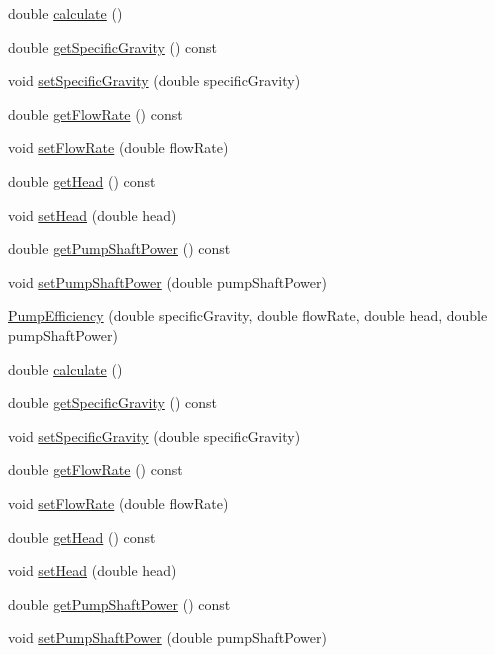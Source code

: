 \begin{DoxyCompactItemize}
\item 
double \hyperlink{class_pump_efficiency_ab45de46019ff182d4f11810b2791a8c9}{calculate} ()
\item 
double \hyperlink{class_pump_efficiency_a6eeeabb70d99a79a636f35ca74d8ec05}{get\+Specific\+Gravity} () const
\item 
void \hyperlink{class_pump_efficiency_afc8b3ecd0fe1a356c82042aa0fc84024}{set\+Specific\+Gravity} (double specific\+Gravity)
\item 
double \hyperlink{class_pump_efficiency_a715c4ade497e99640f09546fad6479bc}{get\+Flow\+Rate} () const
\item 
void \hyperlink{class_pump_efficiency_aad051c44f6bdbc6108f2c40450c9d510}{set\+Flow\+Rate} (double flow\+Rate)
\item 
double \hyperlink{class_pump_efficiency_aa89f7727e67b3e0d20149eee66d10f69}{get\+Head} () const
\item 
void \hyperlink{class_pump_efficiency_addfa92d7c30598ecedcee8f7c47eed29}{set\+Head} (double head)
\item 
double \hyperlink{class_pump_efficiency_aeb6d4f2cce565fbe834d71c7a52b87d1}{get\+Pump\+Shaft\+Power} () const
\item 
void \hyperlink{class_pump_efficiency_ad3c2e64a590528b54e3878f9d1f3223a}{set\+Pump\+Shaft\+Power} (double pump\+Shaft\+Power)
\item 
\hyperlink{class_pump_efficiency_abe1f431db681c3a512a7f9f11ff182cb}{Pump\+Efficiency} (double specific\+Gravity, double flow\+Rate, double head, double pump\+Shaft\+Power)
\item 
double \hyperlink{class_pump_efficiency_ab45de46019ff182d4f11810b2791a8c9}{calculate} ()
\item 
double \hyperlink{class_pump_efficiency_a6eeeabb70d99a79a636f35ca74d8ec05}{get\+Specific\+Gravity} () const
\item 
void \hyperlink{class_pump_efficiency_afc8b3ecd0fe1a356c82042aa0fc84024}{set\+Specific\+Gravity} (double specific\+Gravity)
\item 
double \hyperlink{class_pump_efficiency_a715c4ade497e99640f09546fad6479bc}{get\+Flow\+Rate} () const
\item 
void \hyperlink{class_pump_efficiency_aad051c44f6bdbc6108f2c40450c9d510}{set\+Flow\+Rate} (double flow\+Rate)
\item 
double \hyperlink{class_pump_efficiency_aa89f7727e67b3e0d20149eee66d10f69}{get\+Head} () const
\item 
void \hyperlink{class_pump_efficiency_addfa92d7c30598ecedcee8f7c47eed29}{set\+Head} (double head)
\item 
double \hyperlink{class_pump_efficiency_aeb6d4f2cce565fbe834d71c7a52b87d1}{get\+Pump\+Shaft\+Power} () const
\item 
void \hyperlink{class_pump_efficiency_ad3c2e64a590528b54e3878f9d1f3223a}{set\+Pump\+Shaft\+Power} (double pump\+Shaft\+Power)
\end{DoxyCompactItemize}


